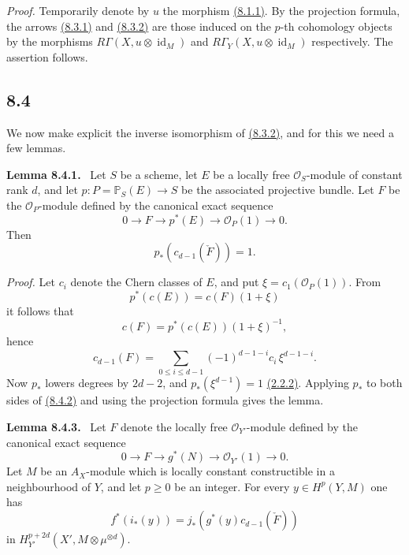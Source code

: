 \documentclass[11pt]{article}
\newenvironment{statement}[1]{\par\medskip\noindent\textbf{#1.}\ }{\par\medskip}
\begin{document}
\emph{Proof.} Temporarily denote by $u$ the morphism \hyperref[sga5:VII:equation:8.1.1]{(8.1.1)}. By the projection formula, the arrows \hyperref[sga5:VII:equation:8.3.1]{(8.3.1)} and \hyperref[sga5:VII:equation:8.3.2]{(8.3.2)} are those induced on the $p$-th cohomology objects by the morphisms $R\Gamma(X,u\otimes\operatorname{id}_M)$ and $R\Gamma_Y(X,u\otimes\operatorname{id}_M)$ respectively. The assertion follows.

\subsection*{8.4}\label{sga5:VII:subsection:8.4}

We now make explicit the inverse isomorphism of \hyperref[sga5:VII:equation:8.3.2]{(8.3.2)}, and for this we need a few lemmas.

\label{sga5:VII:lemma:8.4.1}\begin{statement}{Lemma 8.4.1}
Let $S$ be a scheme, let $E$ be a locally free $\mathcal O_S$-module of constant rank $d$, and let $p:P=\mathbb P_S(E)\to S$ be the associated projective bundle. Let $F$ be the $\mathcal O_P$-module defined by the canonical exact sequence
\[
0\to F\to p^*(E)\to\mathcal O_P(1)\to0.
\]
Then
\[
p_*(c_{d-1}(\check F))=1.
\]
\end{statement}

\emph{Proof.} Let $c_i$ denote the Chern classes of $E$, and put $\xi=c_1(\mathcal O_P(1))$. From
\[
p^*(c(E))=c(F)(1+\xi)
\]
it follows that
\[
c(F)=p^*(c(E))(1+\xi)^{-1},
\]
hence
\[
c_{d-1}(F)=\sum_{0\le i\le d-1}(-1)^{d-1-i}c_i\,\xi^{d-1-i}.
\tag{8.4.2}\label{sga5:VII:equation:8.4.2}
\]
Now $p_*$ lowers degrees by $2d-2$, and $p_*(\xi^{d-1})=1$ \hyperref[sga5:VII:proposition:2.2.2]{(2.2.2)}. Applying $p_*$ to both sides of \hyperref[sga5:VII:equation:8.4.2]{(8.4.2)} and using the projection formula gives the lemma.

\label{sga5:VII:lemma:8.4.3}\begin{statement}{Lemma 8.4.3}
Let $F$ denote the locally free $\mathcal O_{Y'}$-module defined by the canonical exact sequence
\[
0\to F\to g^*(N)\to\mathcal O_{Y'}(1)\to0.
\]
Let $M$ be an $A_X$-module which is locally constant constructible in a neighbourhood of $Y$, and let $p\ge0$ be an integer. For every $y\in H^p(Y,M)$ one has
\[
f^*(i_*(y))=j_*(g^*(y)c_{d-1}(\check F))
\]
in $H_{Y'}^{p+2d}(X',M\otimes\mu^{\otimes d})$.
\end{statement}
\end{document}
